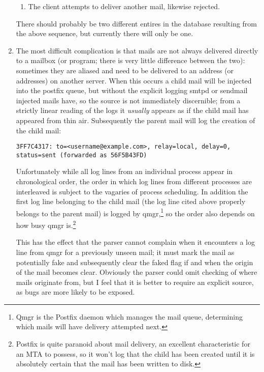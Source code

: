 \documentclass[a4paper,12pt,draft]{article}
\begin{document}
\begin{enumerate}
\begin{enumerate}
            \item The client attempts to deliver another mail, likewise
                rejected.

        \end{enumerate}

        There should probably be two different entires in the database
        resulting from the above sequence, but currently there will only be
        one.

    \item The most difficult complication is that mails are not always
        delivered directly to a mailbox (or program; there is very little
        difference between the two): sometimes they are aliased and
        need to be delivered to an address (or addresses) on another
        server.  When this occurs a child mail will be injected into the
        postfix queue, but without the explicit logging smtpd or sendmail
        injected mails have, so the source is not immediately discernible;
        from a strictly linear reading of the logs it \textit{usually}
        appears as if the child mail has appeared from thin air.
        Subsequently the parent mail will log the creation of the child
        mail:

        \texttt{3FF7C4317: to=<username@example.com>, relay=local, \newline 
        delay=0, status=sent (forwarded as 56F5B43FD)}

        Unfortunately while all log lines from an individual process appear
        in chronological order, the order in which log lines from different
        processes are interleaved is subject to the vagaries of process
        scheduling.  In addition the first log line belonging to the child
        mail (the log line cited above properly belongs to the parent mail)
        is logged by qmgr,\footnote{Qmgr is the Postfix daemon which
        manages the mail queue, determining which mails will have delivery
        attempted next.} so the order also depends on how busy qmgr
        is.\footnote{Postfix is quite paranoid about mail delivery, an
        excellent characteristic for an MTA to possess, so it won't log
        that the child has been created until it is absolutely certain that
        the mail has been written to disk.}

        This has the effect that the parser cannot complain when it
        encounters a log line from qmgr for a previously unseen mail; it
        must mark the mail as potentially fake and subsequently clear the
        faked flag if and when the origin of the mail becomes clear.
        Obviously the parser could omit checking of where mails originate
        from, but I feel that it is better to require an explicit source,
        as bugs are more likely to be exposed.


\end{enumerate}
\end{document}
